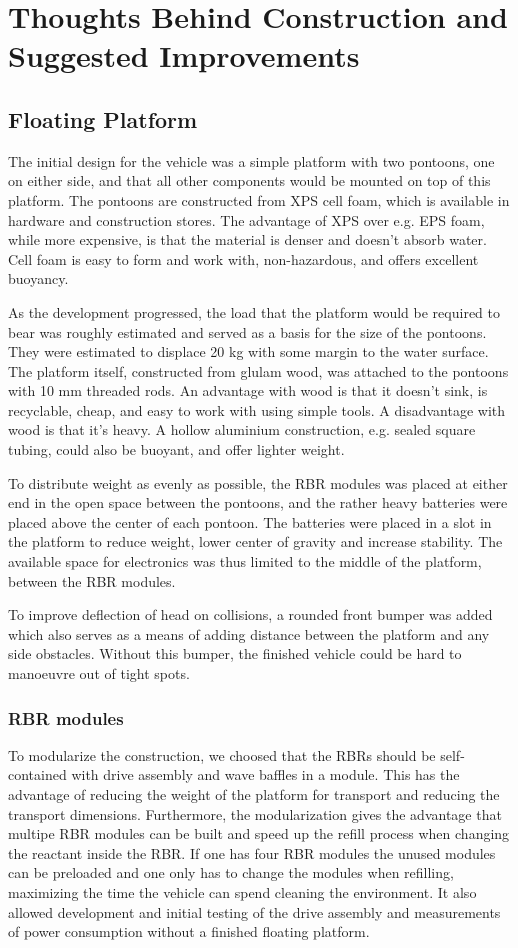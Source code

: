 \section{Thoughts Behind Construction and Suggested Improvements}

\subsection{Floating Platform}
The initial design for the vehicle was a simple platform with two pontoons, one
on either side, and that all other components would be mounted on top of this
platform.  The pontoons are constructed from XPS cell foam, which is available
in hardware and construction stores. The advantage of XPS over e.g. EPS foam,
while more expensive, is that the material is denser and doesn’t absorb
water. Cell foam is easy to form and work with, non-hazardous, and offers
excellent buoyancy.

As the development progressed, the load that the platform would be required to
bear was roughly estimated and served as a basis for the size of the pontoons.
They were estimated to displace 20 kg with some margin to the water surface.
The platform itself, constructed from glulam wood, was attached to the pontoons
with 10 mm threaded rods. An advantage with wood is that it doesn’t sink, is
recyclable, cheap, and easy to work with using simple tools. A disadvantage
with wood is that it’s heavy. A hollow aluminium construction, e.g. sealed
square tubing, could also be buoyant, and offer lighter weight.

To distribute weight as evenly as possible, the RBR modules was placed at
either end in the open space between the pontoons, and the rather heavy
batteries were placed above the center of each pontoon. The batteries were
placed in a slot in the platform to reduce weight, lower center of gravity and
increase stability. The available space for electronics was thus limited to the
middle of the platform, between the RBR modules.

To improve deflection of head on collisions, a rounded front bumper was added
which also serves as a means of adding distance between the platform and any
side obstacles. Without this bumper, the finished vehicle could be hard to
manoeuvre out of tight spots.

\subsubsection{RBR modules}
To modularize the construction, we choosed that the RBRs should be
self-contained with drive assembly and wave baffles in a module. This has the
advantage of reducing the weight of the platform for transport and reducing the
transport dimensions. Furthermore, the modularization gives the advantage that
multipe RBR modules can be built and speed up the refill process when changing
the reactant inside the RBR. If one has four RBR modules the unused
modules can be preloaded and one only has to change the modules when refilling,
maximizing the time the vehicle can spend cleaning the environment. It
also allowed development and initial testing of the drive assembly and
measurements of power consumption without a finished floating platform.

